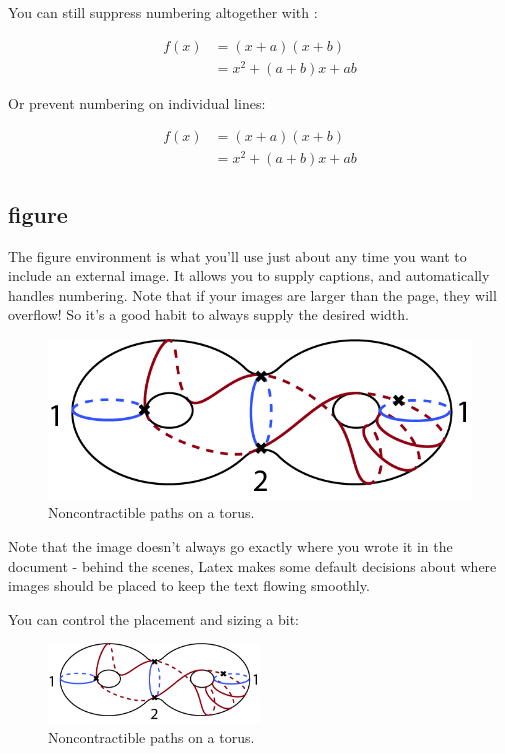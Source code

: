 \documentclass{article}
\begin{document}
        You can still suppress numbering altogether with \*:
        
        \begin{align*}
         f(x) &= (x+a)(x+b) \\
              &= x^2 + (a+b)x + ab
        \end{align*}
        
        Or prevent numbering on individual lines:
        
        \begin{align}
         f(x) &= (x+a)(x+b) \nonumber \\
              &= x^2 + (a+b)x + ab
        \end{align}

    \subsection{figure}
        The figure environment is what you'll use just about any time you want to include an external image. It allows you to supply captions, and automatically handles numbering. Note that if your images are larger than the page, they will overflow! So it's a good habit to always supply the desired width.
        
        \begin{figure}
          \caption{Noncontractible paths on a torus.}
            \includegraphics[width=\textwidth]{ending-3} 
        \end{figure}
        
        Note that the image doesn't always go exactly where you wrote it in the document - behind the scenes, Latex makes some default decisions about where images should be placed to keep the text flowing smoothly.
        
        You can control the placement and sizing a bit:
        \begin{figure}[h] %
        \centering
          \caption{Noncontractible paths on a torus.}
            \includegraphics[width=0.5\textwidth,keepaspectratio]{ending-3}
        \end{figure}
\end{document}
